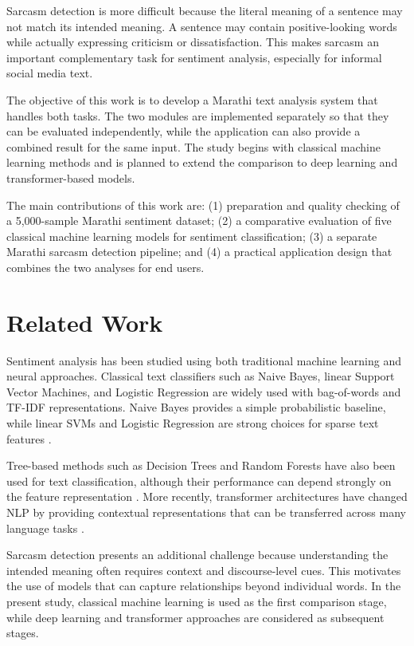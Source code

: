 \documentclass[11pt]{article}
\begin{document}
Sarcasm detection is more difficult because the literal meaning of a sentence may not match its intended meaning. A sentence may contain positive-looking words while actually expressing criticism or dissatisfaction. This makes sarcasm an important complementary task for sentiment analysis, especially for informal social media text.

The objective of this work is to develop a Marathi text analysis system that handles both tasks. The two modules are implemented separately so that they can be evaluated independently, while the application can also provide a combined result for the same input. The study begins with classical machine learning methods and is planned to extend the comparison to deep learning and transformer-based models.

The main contributions of this work are: (1) preparation and quality checking of a 5,000-sample Marathi sentiment dataset; (2) a comparative evaluation of five classical machine learning models for sentiment classification; (3) a separate Marathi sarcasm detection pipeline; and (4) a practical application design that combines the two analyses for end users.

\section{Related Work}
Sentiment analysis has been studied using both traditional machine learning and neural approaches. Classical text classifiers such as Naive Bayes, linear Support Vector Machines, and Logistic Regression are widely used with bag-of-words and TF-IDF representations. Naive Bayes provides a simple probabilistic baseline, while linear SVMs and Logistic Regression are strong choices for sparse text features \citep{manning2008,joachims1998,pedregosa2011}.

Tree-based methods such as Decision Trees and Random Forests have also been used for text classification, although their performance can depend strongly on the feature representation \citep{quinlan1986,breiman2001}. More recently, transformer architectures have changed NLP by providing contextual representations that can be transferred across many language tasks \citep{vaswani2017,devlin2019}.

Sarcasm detection presents an additional challenge because understanding the intended meaning often requires context and discourse-level cues. This motivates the use of models that can capture relationships beyond individual words. In the present study, classical machine learning is used as the first comparison stage, while deep learning and transformer approaches are considered as subsequent stages.
\end{document}
